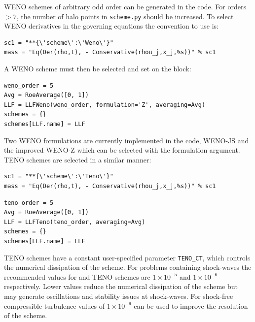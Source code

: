 \documentclass[11pt]{article}
\begin{document}
WENO schemes of arbitrary odd order can be generated in the code. For orders $ > 7$, the number of halo points in \verb|scheme.py| should be increased. To select WENO derivatives in the governing equations the convention to use is:
\begin{lstlisting}
sc1 = "**{\'scheme\':\'Weno\'}"
mass = "Eq(Der(rho,t), - Conservative(rhou_j,x_j,%s))" % sc1
\end{lstlisting}
A WENO scheme must then be selected and set on the block:
\begin{lstlisting}
weno_order = 5
Avg = RoeAverage([0, 1])
LLF = LLFWeno(weno_order, formulation='Z', averaging=Avg)
schemes = {}
schemes[LLF.name] = LLF
\end{lstlisting}
Two WENO formulations are currently implemented in the code, WENO-JS and the improved WENO-Z which can be selected with the formulation argument. TENO schemes are selected in a similar manner:
\begin{lstlisting}
sc1 = "**{\'scheme\':\'Teno\'}"
mass = "Eq(Der(rho,t), - Conservative(rhou_j,x_j,%s))" % sc1
\end{lstlisting}
\begin{lstlisting}
teno_order = 5
Avg = RoeAverage([0, 1])
LLF = LLFTeno(teno_order, averaging=Avg)
schemes = {}
schemes[LLF.name] = LLF
\end{lstlisting}
TENO schemes have a constant user-specified parameter \verb|TENO_CT|, which controls the numerical dissipation of the scheme. For problems containing shock-waves the recommended values for  and  TENO schemes are $1\times 10^{-5}$ and $1 \times 10^{-6}$ respectively. Lower values reduce the numerical dissipation of the scheme but may generate oscillations and stability issues at shock-waves. For shock-free compressible turbulence values of $1 \times 10^{-9}$ can be used to improve the resolution of the scheme.
\end{document}
